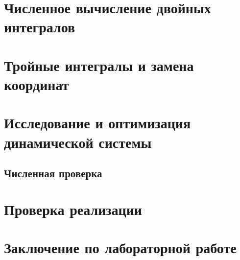 \documentclass[12pt,a4paper]{article}
\begin{document}
\sloppy



\section{Численное вычисление двойных интегралов}


\section{Тройные интегралы и замена координат}




\section{Исследование и оптимизация динамической системы}




\subsection{Численная проверка}





\section*{Проверка реализации}


\section*{Заключение по лабораторной работе}

\end{document}
